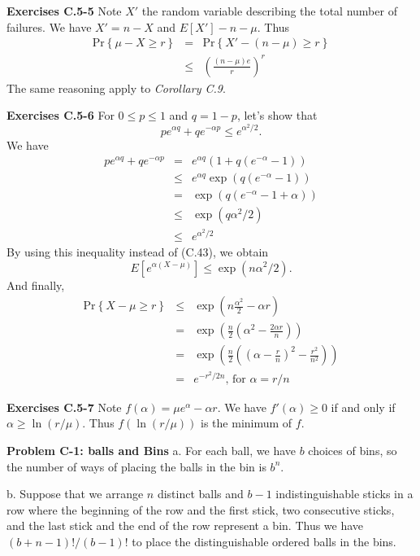 \documentclass[a4paper,12pt]{article}
\newcommand{\newpar}[1]
{\bigskip \noindent \textbf{Exercises #1} \newline}
\newcommand{\newprob}[1]
{\bigskip \noindent \textbf{Problem #1} \newline}
\newcommand{\subpar}[1]
{\medskip \noindent #1.}
\newcommand{\prob}[1]{\mathrm{Pr}\left\{ #1 \right\}}
\begin{document}
\newpar{C.5-5}
Note $X'$ the random variable describing the total number of
failures.  We have $X' = n - X$ and $E[X'] - n - \mu$.  Thus
\begin{eqnarray*}
  \prob{\mu - X \ge r} &=& \prob{X' - (n -\mu) \ge r} \\
  &\le& \left(\frac{(n - \mu)e}{r}\right)^r
\end{eqnarray*}
The same reasoning apply to \emph{Corollary C.9}.

\newpar{C.5-6}
For $0 \le p \le 1$ and $q = 1-p$, let's show that
\[ p e^{\alpha q} + q e^{-\alpha p} \le e^{\alpha^2/2}.\]
We have
\begin{eqnarray*}
  p e^{\alpha q} + q e^{-\alpha p} &=&
  e^{\alpha q}(1 + q(e^{-\alpha} - 1)) \\ &\le& 
  e^{\alpha q}\exp\left(q(e^{-\alpha}-1)\right) \\ &=&
  \exp\left(q(e^{-\alpha}-1+\alpha)\right) \\ &\le&
  \exp\left(q \alpha^2/2\right) \\ &\le&
  e^{\alpha^2/2}
\end{eqnarray*}
By using this inequality instead of (C.43), we obtain
\[ E[e^{\alpha(X-\mu)}] \le \exp(n\alpha^2/2).\]
And finally,
\begin{eqnarray*}
  \prob{X - \mu \ge r} &\le& \exp\left(n\frac{\alpha^2}{2} - \alpha
  r\right) \\ &=&
  \exp\left(\frac{n}{2}\left(\alpha^2 - \frac{2\alpha
    r}{n}\right)\right) \\ &=&
  \exp\left(\frac{n}{2}\left(\left(\alpha - \frac{r}{n}\right)^2
  - \frac{r^2}{n^2}\right)\right) \\
  &=& e^{-r^2/2n},\,\mbox{for $\alpha = r/n$}
\end{eqnarray*}

\newpar{C.5-7}
Note $f(\alpha) = \mu e^\alpha - \alpha r$.
We have $f'(\alpha) \ge 0$ if and only if $\alpha \ge \ln(r/\mu)$.
Thus $f(\ln(r/\mu))$ is the minimum of $f$.

\newprob{C-1: balls and Bins}
\subpar{a}  For each ball, we have $b$ choices of bins, so the number
of ways of placing the balls in the bin is $b^n$.

\subpar{b}  Suppose that we arrange $n$ distinct balls and $b-1$
indistinguishable sticks in a row where the beginning of the row and the
first stick, two consecutive sticks, and the last stick and the end of
the row represent a bin.  Thus we have $(b+n-1)!/(b-1)!$ to place the
distinguishable ordered balls in the bins.
\end{document}

